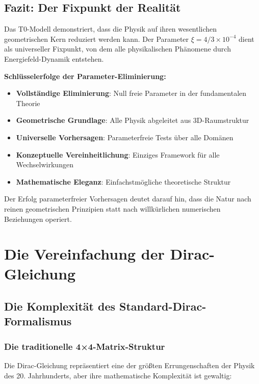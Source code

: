 \documentclass[12pt,a4paper]{report}
\begin{document}
	\section{Fazit: Der Fixpunkt der Realität}
	\label{sec:conclusion_fixed_point}
	
	Das T0-Modell demonstriert, dass die Physik auf ihren wesentlichen geometrischen Kern reduziert werden kann. Der Parameter $\xi = 4/3 \times 10^{-4}$ dient als universeller Fixpunkt, von dem alle physikalischen Phänomene durch Energiefeld-Dynamik entstehen.
	
	\textbf{Schlüsselerfolge der Parameter-Eliminierung:}
	
	\begin{itemize}
		\item \textbf{Vollständige Eliminierung}: Null freie Parameter in der fundamentalen Theorie
		\item \textbf{Geometrische Grundlage}: Alle Physik abgeleitet aus 3D-Raumstruktur
		\item \textbf{Universelle Vorhersagen}: Parameterfreie Tests über alle Domänen
		\item \textbf{Konzeptuelle Vereinheitlichung}: Einziges Framework für alle Wechselwirkungen
		\item \textbf{Mathematische Eleganz}: Einfachstmögliche theoretische Struktur
	\end{itemize}
	
	Der Erfolg parameterfreier Vorhersagen deutet darauf hin, dass die Natur nach reinen geometrischen Prinzipien statt nach willkürlichen numerischen Beziehungen operiert.
	
	\chapter{Die Vereinfachung der Dirac-Gleichung}
	\label{chap:dirac_simplification}
	
	\section{Die Komplexität des Standard-Dirac-Formalismus}
	\label{sec:dirac_complexity}
	
	\subsection{Die traditionelle 4×4-Matrix-Struktur}
	\label{subsec:traditional_matrices}
	
	Die Dirac-Gleichung repräsentiert eine der größten Errungenschaften der Physik des 20. Jahrhunderts, aber ihre mathematische Komplexität ist gewaltig:
	
\end{document}
